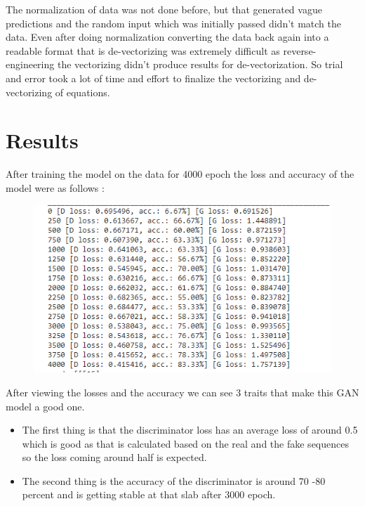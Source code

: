 \documentclass[oneside,12pt]{Classes/RoboticsLaTeX}
\begin{document}
The normalization of data was not done before, but that generated vague predictions and the random input which was initially passed didn't match the data. Even after doing normalization converting the data back again into a readable format that is de-vectorizing was extremely difficult as reverse-engineering the vectorizing didn't produce results for de-vectorization. So trial and error took a lot of time and effort to finalize the vectorizing and de-vectorizing of equations.

\section{Results}

After training the model on the data for 4000 epoch the loss and accuracy of the model were as follows :

\begin{figure}[H]
  \includegraphics[scale = 1.2]{Capture}
\end{figure}

After viewing the losses and the accuracy we can see 3 traits that make this GAN model a good one.

\begin{itemize}
  \item The first thing is that the discriminator loss has an average loss of around 0.5 which is good as that is calculated based on the real and the fake sequences so the loss coming around half is expected. 
\end{itemize}

\begin{itemize}
  \item The second thing is the accuracy of the discriminator is around 70 -80 percent and is getting stable at that slab after 3000 epoch.
\end{itemize}
\end{document}
